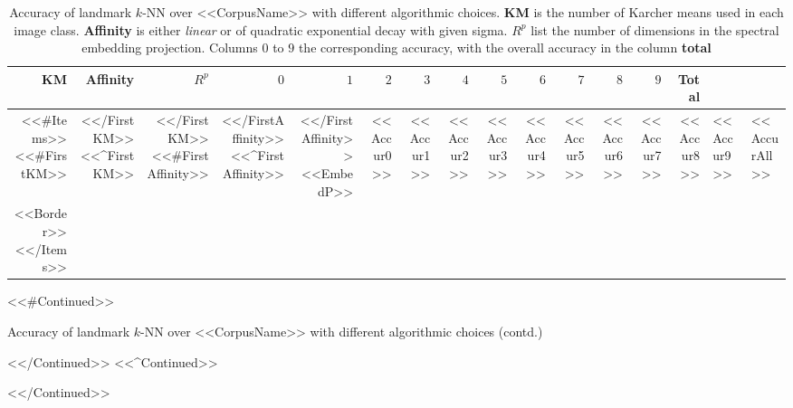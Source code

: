 \begin{table}[h]
	\fontsize{7}{10}\selectfont
	\centering
	\begin{minipage}[t]{0.95\textwidth}
		\centering
		\begin{tabular}{|r|r|r|r|r|r|r|r|r|r|r|r|r|r|}
			\hline
			\textbf{KM} & \textbf{Affinity} & $R^p$
			& \textbf{$0$} & \textbf{$1$} & \textbf{$2$} & \textbf{$3$} & \textbf{$4$}
			& \textbf{$5$} & \textbf{$6$} & \textbf{$7$} & \textbf{$8$} & \textbf{$9$}
			& \textbf{Total} \\
			\hline
			<<#Items>>
			<<#FirstKM>>
			\multirow{12}{*}{<<KM>>} &
			<</FirstKM>>
			<<^FirstKM>>
			&
			<</FirstKM>>
			<<#FirstAffinity>>
			\multirow{2}{*}{<<Affinity>>} &
			<</FirstAffinity>>
			<<^FirstAffinity>>
			&
			<</FirstAffinity>>
			<<EmbedP>> &
			<<Accur0>> &
			<<Accur1>> &
			<<Accur2>> &
			<<Accur3>> &
			<<Accur4>> &
			<<Accur5>> &
			<<Accur6>> &
			<<Accur7>> &
			<<Accur8>> &
			<<Accur9>> &
			<<AccurAll>>
			\\
			<<Border>>
			<</Items>>
		\end{tabular}
	\end{minipage}
	<<#Continued>>
    \caption[Accuracy of landmark $k$-NN over <<CorpusName>> with different algorithmic choices (contd.)]
	{Accuracy of landmark $k$-NN over <<CorpusName>> with different algorithmic choices (contd.)}
	<</Continued>>
	<<^Continued>>
    \caption[Accuracy of landmark $k$-NN over <<CorpusName>> with different algorithmic choices]
	{Accuracy of landmark $k$-NN over <<CorpusName>> with different algorithmic choices. \textbf{KM} is the
	number of Karcher means used in each image class. \textbf{Affinity} is either {\it linear} or of quadratic
	exponential decay with given sigma. $R^p$ list the number of dimensions in the spectral embedding projection.
	Columns $0$ to $9$ the corresponding accuracy, with the overall accuracy in the column \textbf{total}
	}
	\label{tab:<<Corpus>>Accuracy}
	<</Continued>>
\end{table}
